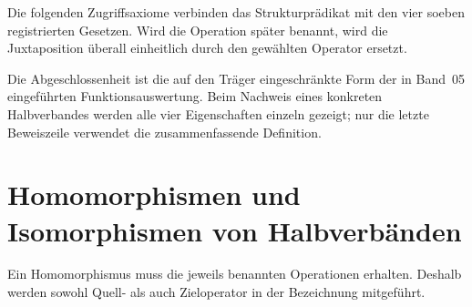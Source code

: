 \documentclass[main.tex]{subfiles}
\begin{document}
Die folgenden Zugriffsaxiome verbinden das Strukturprädikat mit den vier
soeben registrierten Gesetzen. Wird die Operation später benannt, wird die
Juxtaposition überall einheitlich durch den gewählten Operator ersetzt.

\par\smallskip

\par\smallskip

\par\smallskip


Die Abgeschlossenheit ist die auf den Träger eingeschränkte Form der in
Band~05 eingeführten Funktionsauswertung. Beim Nachweis eines konkreten
Halbverbandes werden alle vier Eigenschaften einzeln gezeigt; nur die letzte
Beweiszeile verwendet die zusammenfassende Definition.

\section{Homomorphismen und Isomorphismen von Halbverbänden}

Ein Homomorphismus muss die jeweils benannten Operationen erhalten. Deshalb
werden sowohl Quell- als auch Zieloperator in der Bezeichnung mitgeführt.

\par\smallskip
\end{document}
